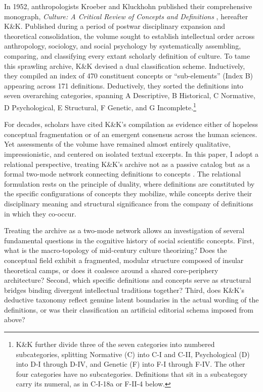 \documentclass[11pt]{article}
\begin{document}
In 1952, anthropologists Kroeber and Kluckhohn published their comprehensive monograph, \emph{Culture: A Critical Review of Concepts and Definitions} \citep{kroeberkluckhohn1952}, hereafter K\&K. Published during a period of postwar disciplinary expansion and theoretical consolidation, the volume sought to establish intellectual order across anthropology, sociology, and social psychology by systematically assembling, comparing, and classifying every extant scholarly definition of culture. To tame this sprawling archive, K\&K devised a dual classification scheme. Inductively, they compiled an index of 470 constituent concepts or ``sub-elements'' (Index B) appearing across 171 definitions. Deductively, they sorted the definitions into seven overarching categories, spanning A Descriptive, B Historical, C Normative, D Psychological, E Structural, F Genetic, and G Incomplete.\footnote{K\&K further divide three of the seven categories into numbered subcategories, splitting Normative (C) into C-I and C-II, Psychological (D) into D-I through D-IV, and Genetic (F) into F-I through F-IV. The other four categories have no subcategories. Definitions that sit in a subcategory carry its numeral, as in C-I-18a or F-II-4 below.}

For decades, scholars have cited K\&K's compilation as evidence either of hopeless conceptual fragmentation or of an emergent consensus across the human sciences. Yet assessments of the volume have remained almost entirely qualitative, impressionistic, and centered on isolated textual excerpts. In this paper, I adopt a relational perspective, treating K\&K's archive not as a passive catalog but as a formal two-mode network connecting definitions to concepts \citep{breiger1974,everett2013dual-projection-c89}. The relational formulation rests on the principle of duality, where definitions are constituted by the specific configurations of concepts they mobilize, while concepts derive their disciplinary meaning and structural significance from the company of definitions in which they co-occur.

Treating the archive as a two-mode network allows an investigation of several fundamental questions in the cognitive history of social scientific concepts. First, what is the macro-topology of mid-century culture theorizing? Does the conceptual field exhibit a fragmented, modular structure composed of insular theoretical camps, or does it coalesce around a shared core-periphery architecture? Second, which specific definitions and concepts serve as structural bridges binding divergent intellectual traditions together? Third, does K\&K's deductive taxonomy reflect genuine latent boundaries in the actual wording of the definitions, or was their classification an artificial editorial schema imposed from above?
\end{document}
